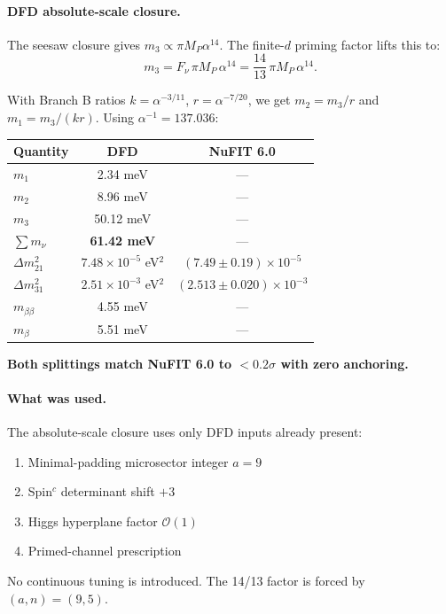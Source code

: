 \paragraph{DFD absolute-scale closure.}
The seesaw closure gives $m_3\propto \pi M_P \alpha^{14}$.
The finite-$d$ priming factor lifts this to:
\begin{equation}\label{eq:m3-branchB-abs}
\boxed{
m_3 = F_\nu\,\pi M_P\,\alpha^{14} = \frac{14}{13}\,\pi M_P\,\alpha^{14}.
}
\end{equation}

With Branch B ratios $k=\alpha^{-3/11}$, $r=\alpha^{-7/20}$, we get $m_2=m_3/r$ and $m_1=m_3/(kr)$.
Using $\alpha^{-1}=137.036$:

\begin{tcolorbox}[colback=red!5!white, colframe=red!60!black, title=DFD-Closed Neutrino Predictions (Zero Anchoring)]
\centering
\scriptsize
\setlength{\tabcolsep}{2pt}
\begin{tabular}{lcc}
\toprule
Quantity & DFD & NuFIT 6.0 \\
\midrule
$m_1$ & 2.34 meV & --- \\
$m_2$ & 8.96 meV & --- \\
$m_3$ & 50.12 meV & --- \\
$\sum m_\nu$ & \textbf{61.42 meV} & --- \\
\midrule
$\Delta m^2_{21}$ & $7.48\!\times\!10^{-5}$ eV$^2$ & $(7.49 \pm 0.19)\!\times\!10^{-5}$ \\
$\Delta m^2_{31}$ & $2.51\!\times\!10^{-3}$ eV$^2$ & $(2.513 \pm 0.020)\!\times\!10^{-3}$ \\
\midrule
$m_{\beta\beta}$ & 4.55 meV & --- \\
$m_\beta$ & 5.51 meV & --- \\
\bottomrule
\end{tabular}

\smallskip
\textbf{Both splittings match NuFIT 6.0 to $< 0.2\sigma$ with zero anchoring.}
\end{tcolorbox}

\paragraph{What was used.}
The absolute-scale closure uses only DFD inputs already present:
\begin{enumerate}[nosep]
\item Minimal-padding microsector integer $a=9$
\item Spin$^c$ determinant shift $+3$
\item Higgs hyperplane factor $\mathcal{O}(1)$
\item Primed-channel prescription
\end{enumerate}
No continuous tuning is introduced. The 14/13 factor is forced by $(a,n)=(9,5)$.

